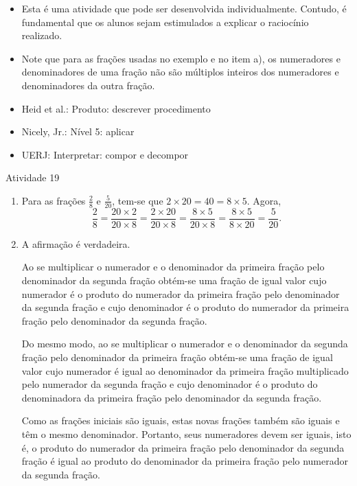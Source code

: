 \begin{multicols}{2}
\begin{itemize} %
    \item       Esta é uma atividade que pode ser desenvolvida individualmente.
Contudo, é fundamental que os alunos sejam estimulados a explicar o raciocínio
realizado.
    \item       Note que para as frações usadas no exemplo e no item a), os
numeradores e denominadores de uma fração não são múltiplos inteiros dos
numeradores e denominadores da outra fração.
\end{itemize} %


   \vspace{.1cm}

 \vspace{.1cm}

\begin{itemize} %
    \item       Heid et al.: Produto: descrever procedimento
    \item       Nicely, Jr.: Nível 5: aplicar
    \item       UERJ: Interpretar: compor e decompor
\end{itemize} %
\clearpage
\end{multicols}
\begin{resposta*}{Atividade 19}
\begin{enumerate} [\quad a)] %
    \item       Para as frações       $\frac{2}{8}$       e
$\frac{5}{20}$, tem-se que        $2 \times 20 = 40 = 8 \times 5$. Agora,
$$\frac{2}{8} = \frac{20 \times 2}{20 \times 8} = \frac{2 \times 20}{20 \times
8} = \frac{8 \times 5}{20 \times 8} = \frac{8 \times 5}{8 \times 20} =
\frac{5}{20}.$$
    \item       A afirmação é verdadeira.

  Ao se multiplicar o numerador e o denominador da primeira fração pelo
denominador da segunda fração obtém-se uma fração de igual valor cujo numerador
é o produto do numerador da primeira fração pelo denominador da segunda fração e
cujo denominador é o produto do numerador da primeira fração pelo denominador da
segunda fração.

  Do mesmo modo, ao se multiplicar o numerador e o denominador da segunda fração
pelo denominador da primeira fração obtém-se uma fração de igual valor cujo
numerador é igual ao denominador da primeira fração multiplicado pelo numerador
da segunda fração e cujo denominador é o produto do denominadora da primeira
fração pelo denominador da segunda fração.

  Como as frações iniciais são iguais, estas novas frações também são iguais e
têm o mesmo denominador. Portanto, seus numeradores devem ser iguais, isto é, o
produto do numerador da primeira fração pelo denominador da segunda fração é
igual ao produto do denominador da primeira fração pelo numerador da segunda
fração.
\end{enumerate} %

  \end{resposta*}


